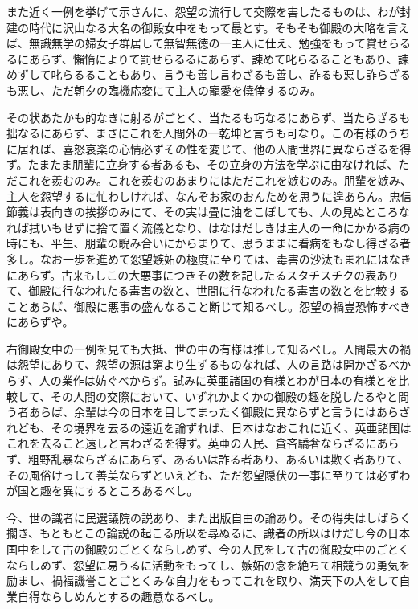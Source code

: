 \documentclass[a4paper, platex, dvipdfmx]{jsarticle}
\begin{document}
また近く一例を挙げて示さんに、怨望の流行して交際を害したるものは、わが封建の時代に沢山なる大名の御殿女中をもって最とす。そもそも御殿の大略を言えば、無識無学の婦女子群居して無智無徳の一主人に仕え、勉強をもって賞せらるるにあらず、懶惰によりて罰せらるるにあらず、諫めて叱らるることもあり、諫めずして叱らるることもあり、言うも善し言わざるも善し、詐るも悪し詐らざるも悪し、ただ朝夕の臨機応変にて主人の寵愛を僥倖するのみ。

その状あたかも的なきに射るがごとく、当たるも巧なるにあらず、当たらざるも拙なるにあらず、まさにこれを人間外の一乾坤と言うも可なり。この有様のうちに居れば、喜怒哀楽の心情必ずその性を変じて、他の人間世界に異ならざるを得ず。たまたま朋輩に立身する者あるも、その立身の方法を学ぶに由なければ、ただこれを羨むのみ。これを羨むのあまりにはただこれを嫉むのみ。朋輩を嫉み、主人を怨望するに忙わしければ、なんぞお家のおんためを思うに遑あらん。忠信節義は表向きの挨拶のみにて、その実は畳に油をこぼしても、人の見ぬところなれば拭いもせずに捨て置く流儀となり、はなはだしきは主人の一命にかかる病の時にも、平生、朋輩の睨み合いにからまりて、思うままに看病をもなし得ざる者多し。なお一歩を進めて怨望嫉妬の極度に至りては、毒害の沙汰もまれにはなきにあらず。古来もしこの大悪事につきその数を記したるスタチスチクの表ありて、御殿に行なわれたる毒害の数と、世間に行なわれたる毒害の数とを比較することあらば、御殿に悪事の盛んなること断じて知るべし。怨望の禍豈恐怖すべきにあらずや。

右御殿女中の一例を見ても大抵、世の中の有様は推して知るべし。人間最大の禍は怨望にありて、怨望の源は窮より生ずるものなれば、人の言路は開かざるべからず、人の業作は妨ぐべからず。試みに英亜諸国の有様とわが日本の有様とを比較して、その人間の交際において、いずれかよくかの御殿の趣を脱したるやと問う者あらば、余輩は今の日本を目してまったく御殿に異ならずと言うにはあらざれども、その境界を去るの遠近を論ずれば、日本はなおこれに近く、英亜諸国はこれを去ること遠しと言わざるを得ず。英亜の人民、貪吝驕奢ならざるにあらず、粗野乱暴ならざるにあらず、あるいは詐る者あり、あるいは欺く者ありて、その風俗けっして善美ならずといえども、ただ怨望隠伏の一事に至りては必ずわが国と趣を異にするところあるべし。

今、世の識者に民選議院の説あり、また出版自由の論あり。その得失はしばらく擱き、もともとこの論説の起こる所以を尋ぬるに、識者の所以はけだし今の日本国中をして古の御殿のごとくならしめず、今の人民をして古の御殿女中のごとくならしめず、怨望に易うるに活動をもってし、嫉妬の念を絶ちて相競うの勇気を励まし、禍福譏誉ことごとくみな自力をもってこれを取り、満天下の人をして自業自得ならしめんとするの趣意なるべし。
\end{document}
